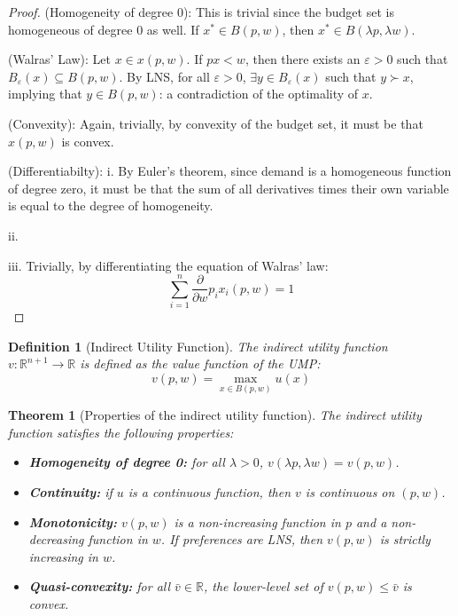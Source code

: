 \documentclass[12pt]{report}
\newtheorem{theorem}{Theorem}[chapter]
\newtheorem{definition}{Definition}[chapter]
\begin{document}
\begin{proof}
(Homogeneity of degree 0): This is trivial since the budget set is homogeneous of degree 0 as well. If $x^*\in B(p,w)$, then $x^*\in B(\lambda p,\lambda w)$.

(Walras' Law): Let $x\in x(p,w)$. If $px<w$, then there exists an $\varepsilon>0$ such that $B_\varepsilon(x)\subseteq B(p,w)$. By LNS, for all $\varepsilon>0$, $\exists y\in B_\varepsilon(x)$ such that $y\succ x$, implying that $y\in B(p,w)$: a contradiction of the optimality of $x$.

(Convexity): Again, trivially, by convexity of the budget set, it must be that $x(p,w)$ is convex.

(Differentiabilty): i. By Euler's theorem, since demand is a homogeneous function of degree zero, it must be that the sum of all derivatives times their own variable is equal to the degree of homogeneity.

ii.

iii. Trivially, by differentiating the equation of Walras' law: $$\sum_{i=1}^{n}\frac{\partial}{\partial w} p_ix_i(p,w) = 1$$
\end{proof}

\begin{definition}[Indirect Utility Function]
The indirect utility function $v:\mathbb{R}^{n+1}\to\mathbb{R}$ is defined as the value function of the UMP: $$v(p,w) = \max_{x\in B(p,w)} u(x) $$
\end{definition}

\begin{theorem}[Properties of the indirect utility function]
The indirect utility function satisfies the following properties:\begin{itemize}
\item \textbf{Homogeneity of degree 0:} for all $\lambda > 0$, $v(\lambda p, \lambda w) = v(p,w)$.
\item \textbf{Continuity:} if $u$ is a continuous function, then $v$ is continuous on $(p,w)$.
\item \textbf{Monotonicity:} $v(p,w)$ is a non-increasing function in $p$ and a non-decreasing function in $w$. If preferences are LNS, then $v(p,w)$ is strictly increasing in $w$.
\item \textbf{Quasi-convexity:} for all $\bar v\in\mathbb{R}$, the lower-level set of $v(p,w)\leq \bar v$ is convex.
\end{itemize}
\end{theorem}
\end{document}
